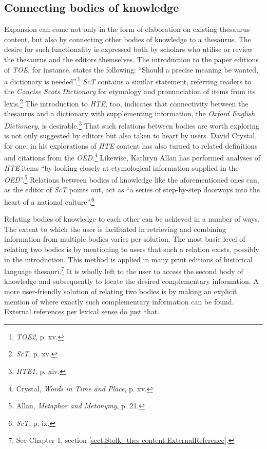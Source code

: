 \subsection{Connecting bodies of knowledge}%

Expansion can come not only in the form of elaboration on existing thesaurus content, but also by connecting other bodies of knowledge to a thesaurus. The desire for such functionality is expressed both by scholars who utilise or review the thesaurus and the editors themselves. The introduction to the paper editions of \textit{TOE}, for instance, states the following: ``Should a precise meaning be wanted, a dictionary is needed''.\footnote{\textit{TOE2}, p. xv.} \textit{ScT} contains a similar statement, referring readers to the \textit{Concise Scots Dictionary} for etymology and pronunciation of items from its lexis.\footnote{\textit{ScT}, p. xv.} The introduction to \textit{HTE}, too, indicates that connectivity between the thesaurus and a dictionary with supplementing information, the \textit{Oxford English Dictionary}, is desirable.\footnote{\textit{HTE1}, p. xiv.} That such relations between bodies are worth exploring is not only suggested by editors but also taken to heart by users. David Crystal, for one, in his explorations of \textit{HTE} content has also turned to related definitions and citations from the \textit{OED}.\footnote{Crystal, \textit{Words in Time and Place}, %
p. xv.} Likewise, Kathryn Allan has performed analyses of \textit{HTE} items ``by looking closely at etymological information supplied in the \textit{OED}''.\footnote{Allan, \textit{Metaphor and Metonymy}, %
p. 21.} Relations between bodies of knowledge like the aforementioned ones can, as the editor of \textit{ScT} points out, act as ``a series of step-by-step doorways into the heart of a national culture''.\footnote{\textit{ScT}, p. ix.}

Relating bodies of knowledge to each other can be achieved in a number of ways. The extent to which the user is facilitated in retrieving and combining information from multiple bodies varies per solution. The most basic level of relating two bodies is by mentioning to users that such a relation exists, possibly in the introduction. This method is applied in many print editions of historical language thesauri.\footnote{See Chapter 1, section \ref{sect:Stolk_thes-content:ExternalReference}.} It is wholly left to the user to access the second body of knowledge and subsequently to locate the desired complementary information. A more user-friendly solution of relating two bodies is by making an explicit mention of where exactly such complementary information can be found. External references per lexical sense do just that.

